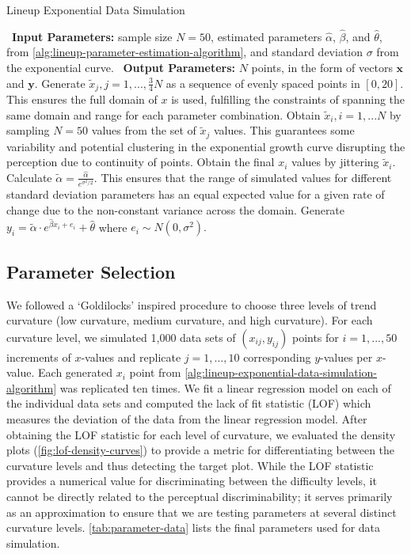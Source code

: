 \documentclass[12pt]{article}
\begin{document}
\begin{algorithm}
  \caption{Lineup Exponential Data Simulation}\label{alg:lineup-exponential-data-simulation-algorithm}
  \begin{algorithmic}[1]
    \Statex \textbullet~\textbf{Input Parameters:} sample size $N = 50$, estimated parameters $\hat\alpha$, $\hat\beta$, and $\hat\theta$, from \cref{alg:lineup-parameter-estimation-algorithm}, and standard deviation $\sigma$ from the exponential curve.
    \Statex \textbullet~\textbf{Output Parameters:} $N$ points, in the form of vectors $\mathbf{x}$ and $\mathbf{y}$.
    \State Generate $\tilde x_j, j = 1,..., \frac{3}{4}N$ as a sequence of evenly spaced points in $[0,20]$. This ensures the full domain of $x$ is used, fulfilling the constraints of spanning the same domain and range for each parameter combination.
    \State Obtain $\tilde x_i, i = 1,...N$ by sampling $N = 50$ values from the set of $\tilde x_j$ values. This guarantees some variability and potential clustering in the exponential growth curve disrupting the perception due to continuity of points.
    \State Obtain the final $x_i$ values by jittering $\tilde x_i$.
    \State Calculate $\tilde\alpha = \frac{\hat\alpha}{e^{\sigma^2/2}}.$ This ensures that the range of simulated values for different standard deviation parameters has an equal expected value for a given rate of change due to the non-constant variance across the domain.
    \State Generate $y_i = \tilde\alpha\cdot e^{\hat\beta x_i + e_i}+\hat\theta$ where $e_i\sim N(0,\sigma^2).$
  \end{algorithmic}
\end{algorithm}

\hypertarget{lineups-parameter-selection}{%
\subsection{Parameter Selection}\label{lineups-parameter-selection}}

We followed a `Goldilocks' inspired procedure to choose three levels of
trend curvature (low curvature, medium curvature, and high curvature).
For each curvature level, we simulated 1,000 data sets of
\((x_{ij}, y_{ij})\) points for \(i = 1,...,50\) increments of
\(x\)-values and replicate \(j = 1,...,10\) corresponding \(y\)-values
per \(x\)-value. Each generated \(x_i\) point from
\cref{alg:lineup-exponential-data-simulation-algorithm} was replicated
ten times. We fit a linear regression model on each of the individual
data sets and computed the lack of fit statistic (LOF) which measures
the deviation of the data from the linear regression model. After
obtaining the LOF statistic for each level of curvature, we evaluated
the density plots (\cref{fig:lof-density-curves}) to provide a metric
for differentiating between the curvature levels and thus detecting the
target plot. While the LOF statistic provides a numerical value for
discriminating between the difficulty levels, it cannot be directly
related to the perceptual discriminability; it serves primarily as an
approximation to ensure that we are testing parameters at several
distinct curvature levels. \cref{tab:parameter-data} lists the final
parameters used for data simulation.
\end{document}
